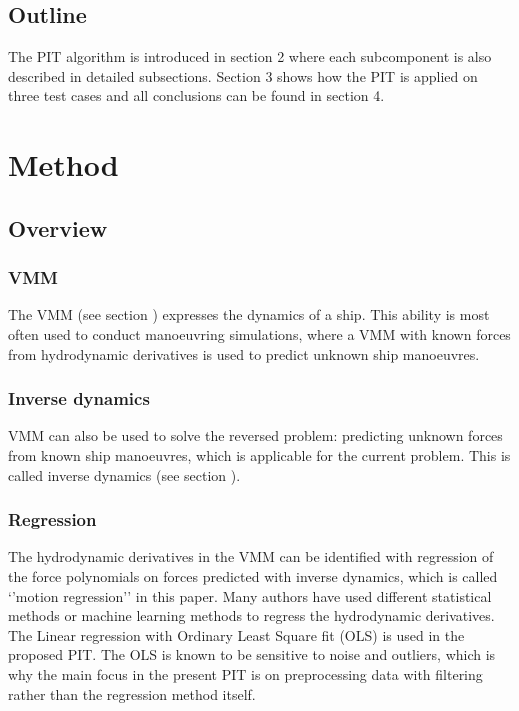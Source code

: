 \documentclass[review]{elsarticle}
\begin{document}
\subsection{Outline}
\label{\detokenize{00.02_introduction:outline}}
\sphinxAtStartPar
The PIT algorithm is introduced in section 2 where each subcomponent is also described in detailed subsections. Section 3 shows how the PIT is applied on three test cases and all conclusions can be found in section 4.


\section{Method}
\label{\detokenize{01.01_method:method}}\label{\detokenize{01.01_method::doc}}

\subsection{Overview}
\label{\detokenize{01.01_method:overview}}

\subsubsection{VMM}
\label{\detokenize{01.01_method:vmm}}
\sphinxAtStartPar
The VMM (see section  {\hyperref[\detokenize{02.01_VMMs:vmm}]{}} ) expresses the dynamics of a ship. This ability is most often used to conduct manoeuvring simulations, where a VMM with known forces from hydrodynamic derivatives is used to predict unknown ship manoeuvres.


\subsubsection{Inverse dynamics}
\label{\detokenize{01.01_method:inverse-dynamics}}
\sphinxAtStartPar
VMM can also be used to solve the reversed problem: predicting unknown forces from known ship manoeuvres, which is applicable for the current problem. This is called inverse dynamics (see section {\hyperref[\detokenize{03.01_inverse_dynamics:inverse-dynamics}]{}}).


\subsubsection{Regression}
\label{\detokenize{01.01_method:regression}}
\sphinxAtStartPar
The hydrodynamic derivatives in the VMM can be identified with regression of the force polynomials on forces predicted with inverse dynamics, which is called ‘’motion regression’’ in this paper. Many authors have used different statistical methods or machine learning methods to regress the hydrodynamic derivatives. The Linear regression with Ordinary Least Square fit (OLS) is used in the proposed PIT. The OLS is known to be sensitive to noise and outliers, which is why the main focus in the present PIT is on pre\sphinxhyphen{}processing data with filtering rather than the regression method itself.
\end{document}
